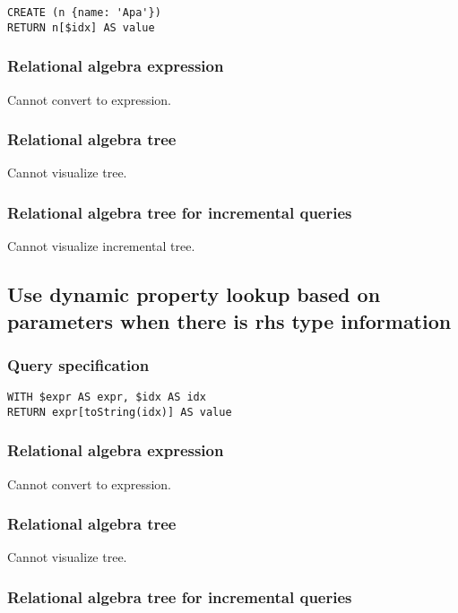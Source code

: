\begin{lstlisting}
CREATE (n {name: 'Apa'})
RETURN n[$idx] AS value
\end{lstlisting}

\subsubsection*{Relational algebra expression}

Cannot convert to expression.

\subsubsection*{Relational algebra tree}

Cannot visualize tree.

\subsubsection*{Relational algebra tree for incremental queries}

Cannot visualize incremental tree.

\subsection{Use dynamic property lookup based on parameters when there is rhs type information}

\subsubsection*{Query specification}

\begin{lstlisting}
WITH $expr AS expr, $idx AS idx
RETURN expr[toString(idx)] AS value
\end{lstlisting}

\subsubsection*{Relational algebra expression}

Cannot convert to expression.

\subsubsection*{Relational algebra tree}

Cannot visualize tree.

\subsubsection*{Relational algebra tree for incremental queries}

